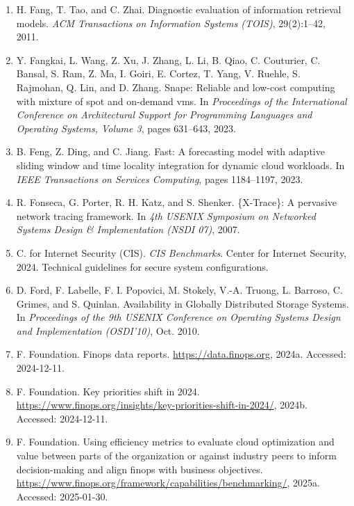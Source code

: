 \documentclass[10pt,UTF8,fontset=fandol]{ctexart}
\begin{document}
\begin{enumerate}[leftmargin=2em,itemsep=2pt]
\item H. Fang, T. Tao, and C. Zhai. Diagnostic evaluation of information retrieval models. \textit{ACM Transactions on Information Systems (TOIS)}, 29(2):1--42, 2011.

\item Y. Fangkai, L. Wang, Z. Xu, J. Zhang, L. Li, B. Qiao, C. Couturier, C. Bansal, S. Ram, Z. Ma, I. Goiri, E. Cortez, T. Yang, V. Ruehle, S. Rajmohan, Q. Lin, and D. Zhang. Snape: Reliable and low-cost computing with mixture of spot and on-demand vms. In \textit{Proceedings of the International Conference on Architectural Support for Programming Languages and Operating Systems, Volume 3}, pages 631--643, 2023.

\item B. Feng, Z. Ding, and C. Jiang. Fast: A forecasting model with adaptive sliding window and time locality integration for dynamic cloud workloads. In \textit{IEEE Transactions on Services Computing}, pages 1184--1197, 2023.

\item R. Fonseca, G. Porter, R. H. Katz, and S. Shenker. \{X-Trace\}: A pervasive network tracing framework. In \textit{4th USENIX Symposium on Networked Systems Design \& Implementation (NSDI 07)}, 2007.

\item C. for Internet Security (CIS). \textit{CIS Benchmarks}. Center for Internet Security, 2024. Technical guidelines for secure system configurations.

\item D. Ford, F. Labelle, F. I. Popovici, M. Stokely, V.-A. Truong, L. Barroso, C. Grimes, and S. Quinlan. Availability in Globally Distributed Storage Systems. In \textit{Proceedings of the 9th USENIX Conference on Operating Systems Design and Implementation (OSDI'10)}, Oct. 2010.

\item F. Foundation. Finops data reports. \url{https://data.finops.org}, 2024a. Accessed: 2024-12-11.

\item F. Foundation. Key priorities shift in 2024. \url{https://www.finops.org/insights/key-priorities-shift-in-2024/}, 2024b. Accessed: 2024-12-11.

\item F. Foundation. Using efficiency metrics to evaluate cloud optimization and value between parts of the organization or against industry peers to inform decision-making and align finops with business objectives. \url{https://www.finops.org/framework/capabilities/benchmarking/}, 2025a. Accessed: 2025-01-30.


\end{enumerate}
\end{document}
